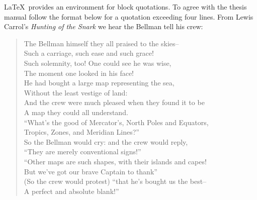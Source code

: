 \LaTeX\ provides an environment for block quotations. To agree with the
thesis manual follow the format below for a quotation exceeding four
lines. From Lewis Carrol's {\it Hunting of the Snark} we hear the
Bellman tell his crew:
 \vspace{.12pt}

{
\ssp
\begin{verse}
The Bellman himself they all praised to the skies--\\
Such a carriage, such ease and such grace!\\
Such solemnity, too! One could see he was wise,\\
The moment one looked in his face!\\
 \vspace{.15in}
He had bought a large map representing the sea,\\
Without the least vestige of land:\\
And the crew were much pleased when they found it to be\\
A map they could all understand.\\
 \vspace{.15in}
``What's the good of Mercator's, North Poles and Equators,\\
Tropics, Zones, and Meridian Lines?''\\
So the Bellman would cry: and the crew would reply,\\
``They are merely conventional signs!''\\
 \vspace{.15in}
``Other maps are such shapes, with their islands and capes!\\
But we've got our brave Captain to thank''\\
(So the crew would protest) ``that he's bought us the best--\\
A perfect and absolute blank!''\\
\end{verse}
}

